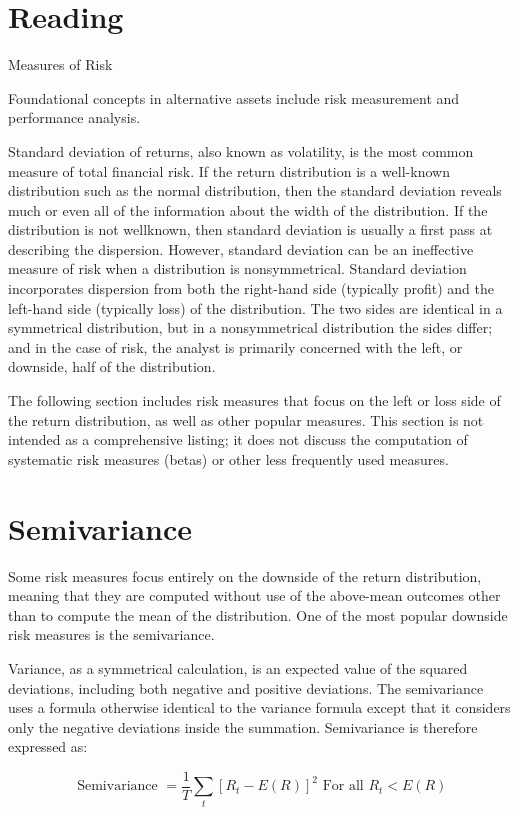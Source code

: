 \documentclass[11pt]{article}
\begin{document}
\section*{Reading}
Measures of Risk

Foundational concepts in alternative assets include risk measurement and performance analysis.

Standard deviation of returns, also known as volatility, is the most common measure of total financial risk. If the return distribution is a well-known distribution such as the normal distribution, then the standard deviation reveals much or even all of the information about the width of the distribution. If the distribution is not wellknown, then standard deviation is usually a first pass at describing the dispersion. However, standard deviation can be an ineffective measure of risk when a distribution is nonsymmetrical. Standard deviation incorporates dispersion from both the right-hand side (typically profit) and the left-hand side (typically loss) of the distribution. The two sides are identical in a symmetrical distribution, but in a nonsymmetrical distribution the sides differ; and in the case of risk, the analyst is primarily concerned with the left, or downside, half of the distribution.

The following section includes risk measures that focus on the left or loss side of the return distribution, as well as other popular measures. This section is not intended as a comprehensive listing; it does not discuss the computation of systematic risk measures (betas) or other less frequently used measures.

\section*{Semivariance}
Some risk measures focus entirely on the downside of the return distribution, meaning that they are computed without use of the above-mean outcomes other than to compute the mean of the distribution. One of the most popular downside risk measures is the semivariance.

Variance, as a symmetrical calculation, is an expected value of the squared deviations, including both negative and positive deviations. The semivariance uses a formula otherwise identical to the variance formula except that it considers only the negative deviations inside the summation. Semivariance is therefore expressed as:


\begin{equation*}
\text { Semivariance }=\frac{1}{T} \sum_{t}\left[R_{t}-E(R)\right]^{2} \text { For all } R_{t}<E(R) \tag{1}
\end{equation*}
\end{document}
